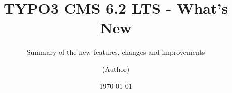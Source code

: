 %
%
%
%

%
%

\documentclass[t]{beamer}

\beamertemplatenavigationsymbolsempty

{
	\usetheme{typo3slides}
}

\title{TYPO3 CMS 6.2 LTS - What's New}
\subtitle{Summary of the new features, changes and improvements}
\author{(Author)}
\date{\today}



\sharefont


\begingroup
	[default]
	\begin{frame}
		\titlepage
	\end{frame}
\endgroup



